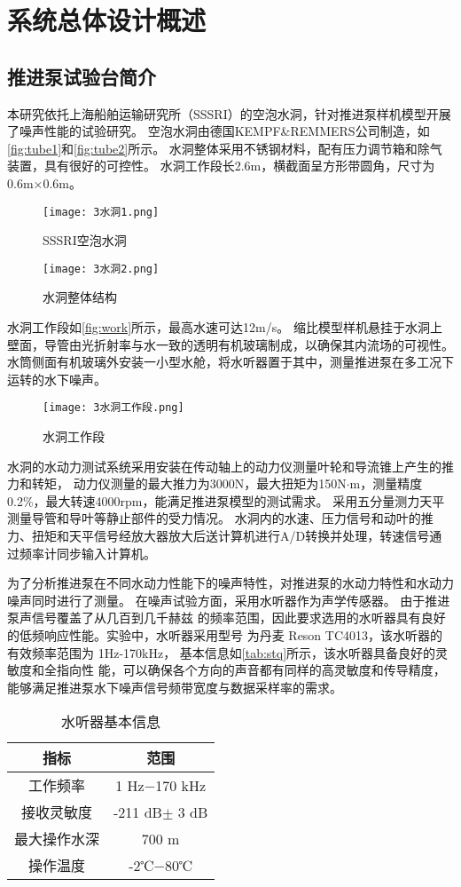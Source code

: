 \section{系统总体设计概述}
\subsection{推进泵试验台简介}
本研究依托上海船舶运输研究所（SSSRI）的空泡水洞，针对推进泵样机模型开展了噪声性能的试验研究。
空泡水洞由德国KEMPF\&REMMERS公司制造，如\autoref{fig:tube1}和\autoref{fig:tube2}所示。
水洞整体采用不锈钢材料，配有压力调节箱和除气装置，具有很好的可控性。
水洞工作段长2.6m，横截面呈方形带圆角，尺寸为0.6m×0.6m。
\begin{figure}[htbp]
    \centering
    \texttt{[image: 3水洞1.png]}
    \caption{\label{fig:tube1}SSSRI空泡水洞}
\end{figure}
\begin{figure}[htbp]
    \centering
    \texttt{[image: 3水洞2.png]}
    \caption{\label{fig:tube2}水洞整体结构}
\end{figure}

水洞工作段如\autoref{fig:work}所示，最高水速可达12m/s。
缩比模型样机悬挂于水洞上壁面，导管由光折射率与水一致的透明有机玻璃制成，以确保其内流场的可视性。
水筒侧面有机玻璃外安装一小型水舱，将水听器置于其中，测量推进泵在多工况下运转的水下噪声。
\begin{figure}[htbp]
    \centering
    \texttt{[image: 3水洞工作段.png]}
    \caption{\label{fig:work}水洞工作段}
\end{figure}

水洞的水动力测试系统采用安装在传动轴上的动力仪测量叶轮和导流锥上产生的推力和转矩，
动力仪测量的最大推力为3000N，最大扭矩为150N$\cdot$m，测量精度0.2\%，最大转速4000rpm，能满足推进泵模型的测试需求。
采用五分量测力天平测量导管和导叶等静止部件的受力情况。
水洞内的水速、压力信号和动叶的推力、扭矩和天平信号经放大器放大后送计算机进行A/D转换并处理，转速信号通过频率计同步输入计算机。

为了分析推进泵在不同水动力性能下的噪声特性，对推进泵的水动力特性和水动力噪声同时进行了测量。
在噪声试验方面，采用水听器作为声学传感器。
由于推进泵声信号覆盖了从几百到几千赫兹
的频率范围，因此要求选用的水听器具有良好的低频响应性能。实验中，水听器采用型号
为丹麦 Reson TC4013，该水听器的有效频率范围为 1Hz-170kHz，
基本信息如\autoref{tab:stq}所示，该水听器具备良好的灵敏度和全指向性
能，可以确保各个方向的声音都有同样的高灵敏度和传导精度，能够满足推进泵水下噪声信号频带宽度与数据采样率的需求。
\begin{table}[htbp]
    \centering
    \caption{\label{tab:stq}水听器基本信息}
    \begin{tabular}{cc}
     \toprule
     指标&范围\\
     \midrule
     工作频率&1 Hz$- $170 kHz\\
     接收灵敏度&-211 dB$\pm$ 3 dB\\
     最大操作水深&700 m\\
     操作温度&-2℃$- $80℃\\
     \bottomrule
    \end{tabular}
\end{table}

